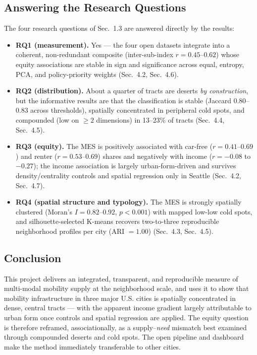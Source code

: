 \documentclass[11pt]{article}
\begin{document}
\subsection{Answering the Research Questions}
The four research questions of Sec.~1.3 are answered directly by the results:
\begin{itemize}[leftmargin=1.4em,itemsep=1pt]
\item \textbf{RQ1 (measurement).} Yes --- the four open datasets integrate into a
coherent, non-redundant composite (inter-sub-index $r=0.45$--$0.62$) whose equity
associations are stable in sign and significance across equal, entropy, PCA, and
policy-priority weights (Sec.~4.2, Sec.~4.6).
\item \textbf{RQ2 (distribution).} About a quarter of tracts are deserts \emph{by
construction}, but the informative results are that the classification is stable
(Jaccard $0.80$--$0.83$ across thresholds), spatially concentrated in peripheral
cold spots, and compounded (low on $\geq2$ dimensions) in 13--23\% of tracts
(Sec.~4.4, Sec.~4.5).
\item \textbf{RQ3 (equity).} The MES is positively associated with car-free
($r=0.41$--$0.69$) and renter ($r=0.53$--$0.69$) shares and negatively with income
($r=-0.08$ to $-0.27$); the income association is largely urban-form-driven and
survives density/centrality controls and spatial regression only in Seattle
(Sec.~4.2, Sec.~4.7).
\item \textbf{RQ4 (spatial structure and typology).} The MES is strongly spatially
clustered (Moran's $I=0.82$--$0.92$, $p<0.001$) with mapped low-low cold spots,
and silhouette-selected K-means recovers two-to-three reproducible neighborhood
profiles per city (ARI $=1.00$) (Sec.~4.3, Sec.~4.5).
\end{itemize}

\subsection{Conclusion}
This project delivers an integrated, transparent, and reproducible measure of
multi-modal mobility supply at the neighborhood scale, and uses it to show that
mobility infrastructure in three major U.S. cities is spatially concentrated in
dense, central tracts --- with the apparent income gradient largely attributable
to urban form once controls and spatial regression are applied. The equity
question is therefore reframed, associationally, as a supply--\emph{need}
mismatch best examined through compounded deserts and cold spots. The open
pipeline and dashboard make the method immediately transferable to other cities.
\end{document}
